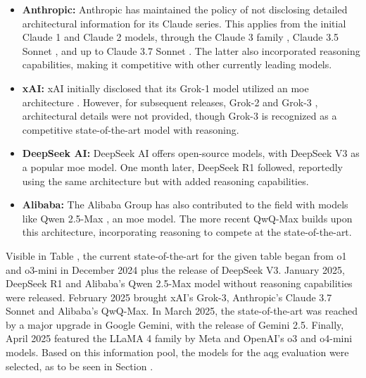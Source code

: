 \begin{itemize}
    \item \textbf{Anthropic:} Anthropic has maintained the policy of not disclosing detailed architectural information for its Claude series. This applies from the initial Claude 1 \cite{anthropic_introducing_2023} and Claude 2 \cite{anthropic_claude_2023} models, through the Claude 3 family \cite{anthropic_introducing_2024-1}, Claude 3.5 Sonnet \cite{anthropic_introducing_2024}, and up to Claude 3.7 Sonnet \cite{anthropic_claude_2025}. The latter also incorporated reasoning capabilities, making it competitive with other currently leading models.

    \item \textbf{xAI:} xAI initially disclosed that its Grok-1 model utilized an \ac{moe} architecture \cite{xai_open_2024}. However, for subsequent releases, Grok-2 \cite{xai_grok-2_2024} and Grok-3 \cite{xai_grok_2025}, architectural details were not provided, though Grok-3 is recognized as a competitive state-of-the-art model with reasoning.

    \item \textbf{DeepSeek AI:} DeepSeek AI offers open-source models, with DeepSeek V3 \cite{deepseek-ai_deepseek-v3_2025} as a popular \ac{moe} model. One month later, DeepSeek R1 \cite{deepseek-ai_deepseek-r1_2025} followed, reportedly using the same architecture but with added reasoning capabilities.

    \item \textbf{Alibaba:} The Alibaba Group has also contributed to the field with models like Qwen 2.5-Max \cite{team_qwen25-max_2025}, an \ac{moe} model. The more recent QwQ-Max \cite{team_thinkthink_2025} builds upon this architecture, incorporating reasoning to compete at the state-of-the-art.
\end{itemize}

Visible in Table , the current state-of-the-art for the given table began from o1 and o3-mini in December 2024 plus the release of DeepSeek V3. January 2025, DeepSeek R1 and Alibaba's Qwen 2.5-Max model without reasoning capabilities were released. February 2025 brought xAI's Grok-3, Anthropic's Claude 3.7 Sonnet and Alibaba's QwQ-Max. In March 2025, the state-of-the-art was reached by a major upgrade in Google Gemini, with the release of Gemini 2.5. Finally, April 2025 featured the LLaMA 4 family by Meta and OpenAI's o3 and o4-mini models. Based on this information pool, the models for the \ac{aqg} evaluation were selected, as to be seen in Section . 


